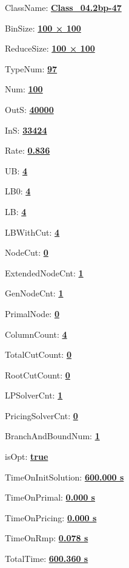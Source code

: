 \documentclass[11pt]{article}
\begin{document}
\pagestyle{empty}


ClassName: \underline{\textbf{Class_04.2bp-47}}
\par
BinSize: \underline{\textbf{100 × 100}}
\par
ReduceSize: \underline{\textbf{100 × 100}}
\par
TypeNum: \underline{\textbf{97}}
\par
Num: \underline{\textbf{100}}
\par
OutS: \underline{\textbf{40000}}
\par
InS: \underline{\textbf{33424}}
\par
Rate: \underline{\textbf{0.836}}
\par
UB: \underline{\textbf{4}}
\par
LB0: \underline{\textbf{4}}
\par
LB: \underline{\textbf{4}}
\par
LBWithCut: \underline{\textbf{4}}
\par
NodeCut: \underline{\textbf{0}}
\par
ExtendedNodeCnt: \underline{\textbf{1}}
\par
GenNodeCnt: \underline{\textbf{1}}
\par
PrimalNode: \underline{\textbf{0}}
\par
ColumnCount: \underline{\textbf{4}}
\par
TotalCutCount: \underline{\textbf{0}}
\par
RootCutCount: \underline{\textbf{0}}
\par
LPSolverCnt: \underline{\textbf{1}}
\par
PricingSolverCnt: \underline{\textbf{0}}
\par
BranchAndBoundNum: \underline{\textbf{1}}
\par
isOpt: \underline{\textbf{true}}
\par
TimeOnInitSolution: \underline{\textbf{600.000 s}}
\par
TimeOnPrimal: \underline{\textbf{0.000 s}}
\par
TimeOnPricing: \underline{\textbf{0.000 s}}
\par
TimeOnRmp: \underline{\textbf{0.078 s}}
\par
TotalTime: \underline{\textbf{600.360 s}}
\par
\newpage
\end{document}
